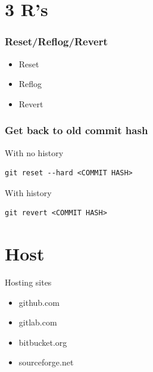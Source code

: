 \documentclass[bigger, presentation]{beamer}
\begin{document}
\section{3 R's}
\label{sec-5}
\begin{frame}
\frametitle{Reset/Reflog/Revert}
\label{sec-5-1}

 
\begin{itemize}
\item Reset
\item Reflog
\item Revert
\end{itemize}
\end{frame}
\begin{frame}[fragile]
\frametitle{Get back to old commit hash}
\label{sec-5-2}
\begin{block}{With no history}
\label{sec-5-2-1}


\begin{verbatim}
git reset --hard <COMMIT HASH>
\end{verbatim}
\end{block}
\begin{block}{With history}
\label{sec-5-2-2}


\begin{verbatim}
git revert <COMMIT HASH>
\end{verbatim}
\end{block}
\end{frame}
\section{Host}
\label{sec-6}
\begin{frame}
\begin{block}{Hosting sites}
\label{sec-6-1-1}

\begin{itemize}
\item github.com
\item gitlab.com
\item bitbucket.org
\item sourceforge.net
\end{itemize}
     
\end{block}
\end{frame}
\end{document}
